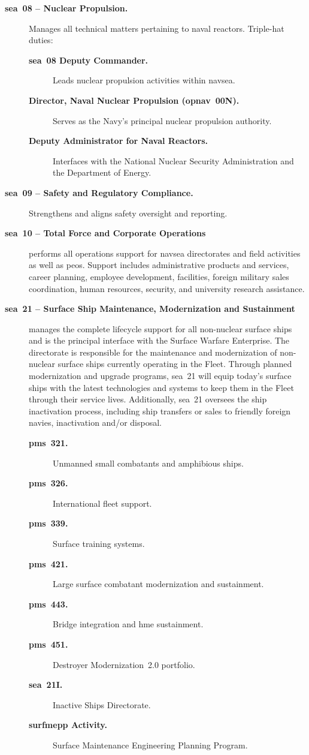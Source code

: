 \documentclass[../src/main.tex]{subfiles}
\begin{document}
\begin{description}
  \item[\textbf{\ac{sea}~08 -- Nuclear Propulsion.}] Manages all technical matters pertaining to naval reactors. Triple-hat duties:
        \begin{description}
          \item[\textbf{\ac{sea}~08 Deputy Commander.}] Leads nuclear propulsion activities within \ac{navsea}.
          \item[\textbf{Director, Naval Nuclear Propulsion (\ac{opnav}~00N).}] Serves as the Navy's principal nuclear propulsion authority.
          \item[\textbf{Deputy Administrator for Naval Reactors.}] Interfaces with the National Nuclear Security Administration and the Department of Energy.
        \end{description}
  \item[\textbf{\ac{sea}~09 -- Safety and Regulatory Compliance.}] Strengthens and aligns safety oversight and reporting.
  \item[\textbf{\ac{sea}~10 -- Total Force and Corporate Operations}] performs all operations support for \ac{navsea} directorates and field activities as well as \acp{peo}.  Support includes administrative products and services, career planning, employee development, facilities, foreign military sales coordination, human resources, security, and university research assistance.
  \item[\textbf{\ac{sea}~21 -- Surface Ship Maintenance, Modernization and Sustainment}] manages the complete lifecycle support for all non-nuclear surface ships and is the principal interface with the Surface Warfare Enterprise. The directorate is responsible for the maintenance and modernization of non-nuclear surface ships currently operating in the Fleet. Through planned modernization and upgrade programs, \ac{sea}~21 will equip today's surface ships with the latest technologies and systems to keep them in the Fleet through their service lives. Additionally, \ac{sea}~21 oversees the ship inactivation process, including ship transfers or sales to friendly foreign navies, inactivation and/or disposal.
        \begin{description}
          \item[\textbf{\ac{pms}~321.}] Unmanned small combatants and amphibious ships.
          \item[\textbf{\ac{pms}~326.}] International fleet support.
          \item[\textbf{\ac{pms}~339.}] Surface training systems.
          \item[\textbf{\ac{pms}~421.}] Large surface combatant modernization and sustainment.
          \item[\textbf{\ac{pms}~443.}] Bridge integration and \ac{hme} sustainment.
          \item[\textbf{\ac{pms}~451.}] Destroyer Modernization~2.0 portfolio.
          \item[\textbf{\ac{sea}~21I.}] Inactive Ships Directorate.
          \item[\textbf{\ac{surfmepp} Activity.}] Surface Maintenance Engineering Planning Program.
        \end{description}
\end{description}
\end{document}
